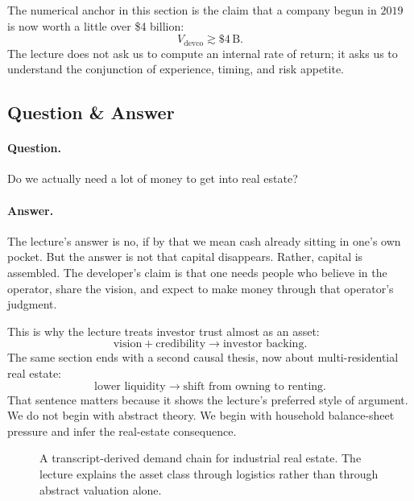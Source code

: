 The numerical anchor in this section is the claim that a company begun in \(2019\) is now worth a little over \$4 billion:
\begin{equation}
V_{\mathrm{devco}} \gtrsim \$4\,\mathrm{B}.
\end{equation}
The lecture does not ask us to compute an internal rate of return; it asks us to understand the conjunction of experience, timing, and risk appetite.

\subsection{Question \& Answer}

\paragraph{Question.} Do we actually need a lot of money to get into real estate?

\paragraph{Answer.} The lecture's answer is no, if by that we mean cash already sitting in one's own pocket. But the answer is not that capital disappears. Rather, capital is assembled. The developer's claim is that one needs people who believe in the operator, share the vision, and expect to make money through that operator's judgment.

This is why the lecture treats investor trust almost as an asset:
\begin{equation}
\text{vision} + \text{credibility} \to \text{investor backing}.
\end{equation}
The same section ends with a second causal thesis, now about multi-residential real estate:
\begin{equation}
\text{lower liquidity} \to \text{shift from owning to renting}.
\end{equation}
That sentence matters because it shows the lecture's preferred style of argument. We do not begin with abstract theory. We begin with household balance-sheet pressure and infer the real-estate consequence.

\begin{figure}[h]
\centering
{}
\caption{A transcript-derived demand chain for industrial real estate. The lecture explains the asset class through logistics rather than through abstract valuation alone.}
\end{figure}

